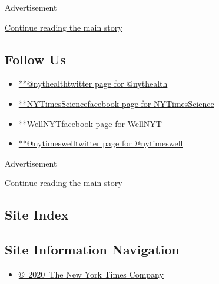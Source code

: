 Advertisement

\protect\hyperlink{after-mid3}{Continue reading the main story}

\hypertarget{follow-us}{%
\subsection{Follow Us}\label{follow-us}}

\begin{itemize}
\tightlist
\item
  \href{https://twitter.com/nythealth}{**@nythealthtwitter page for
  @nythealth}
\item
  \href{https://www.facebook.com/NYTimesScience}{**NYTimesSciencefacebook
  page for NYTimesScience}
\item
  \href{https://www.facebook.com/WellNYT}{**WellNYTfacebook page for
  WellNYT}
\item
  \href{https://twitter.com/nytimeswell}{**@nytimeswelltwitter page for
  @nytimeswell}
\end{itemize}

Advertisement

\protect\hyperlink{after-mktg}{Continue reading the main story}

\hypertarget{site-index}{%
\subsection{Site Index}\label{site-index}}

\hypertarget{site-information-navigation}{%
\subsection{Site Information
Navigation}\label{site-information-navigation}}

\begin{itemize}
\tightlist
\item
  \href{https://help.nytimes.com/hc/en-us/articles/115014792127-Copyright-notice}{©~2020~The
  New York Times Company}
\end{itemize}

